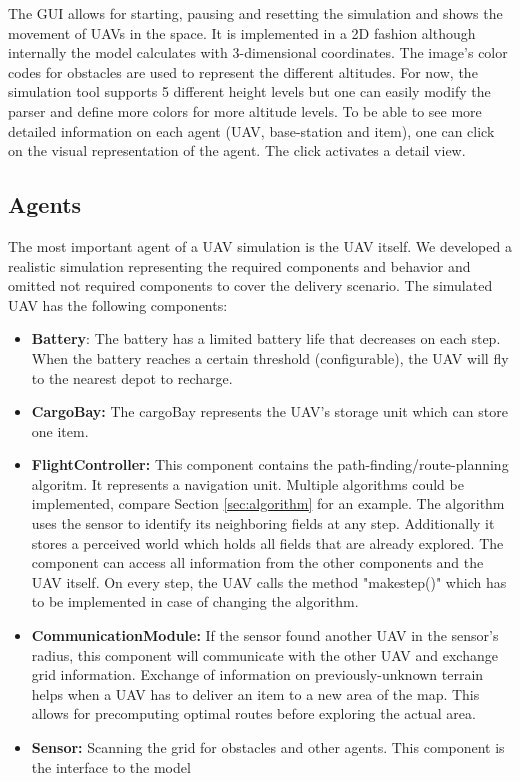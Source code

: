 The GUI allows for starting, pausing and resetting the simulation and shows the movement of UAVs in the space. It is implemented in a 2D fashion although internally the model calculates with 3-dimensional coordinates. The image's color codes for obstacles are used to represent the different altitudes. For now, the simulation tool supports 5 different height levels but one can easily modify the parser and define more colors for more altitude levels.
To be able to see more detailed information on each agent (UAV, base-station and item), one can click on the visual representation of the agent. The click activates a detail view. 

\subsection{Agents}\label{sec:UAV}
The most important agent of a UAV simulation is the UAV itself. We developed a realistic simulation representing the required components and behavior and omitted not required components to cover the delivery scenario. The simulated UAV has the following components:
	\begin{itemize}
			\item \textbf{Battery}: The battery has a limited battery life that decreases on each step. When the battery reaches a certain threshold (configurable), the UAV will fly to the nearest depot to recharge.
					\item \textbf{CargoBay:} The cargoBay represents the UAV's storage unit which can store one item.
		\item \textbf{FlightController:} This component contains the path-finding/route-planning algoritm. It represents a navigation unit. Multiple algorithms could be implemented, compare Section \ref{sec:algorithm} for an example. The algorithm uses the sensor to identify its neighboring fields at any step. Additionally it stores a perceived world which holds all fields that are already explored. The component can access all information from the other components and the UAV itself. On every step, the UAV calls the method "make\textunderscore step()" which has to be implemented in case of changing the algorithm.
		\item \textbf{CommunicationModule:} If the sensor found another UAV in the sensor's radius, this component will communicate with the other UAV and exchange grid information. Exchange of information on previously-unknown terrain helps when a UAV has to deliver an item to a new area of the map. This allows for precomputing optimal routes before exploring the actual area.
		\item \textbf{Sensor:} Scanning the grid for obstacles and other agents. This component is the interface to the model
	\end{itemize}

